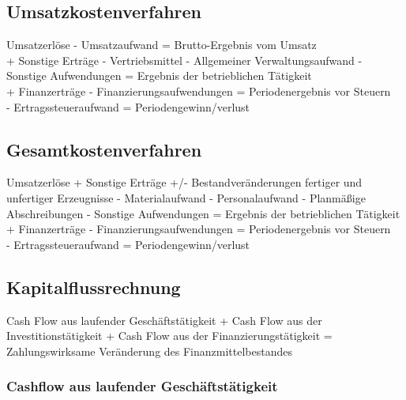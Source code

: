 \documentclass{article}
\begin{document}
\subsection{Umsatzkostenverfahren}

Umsatzerlöse - Umsatzaufwand = Brutto-Ergebnis vom Umsatz \\
+ Sonstige Erträge - Vertriebsmittel - Allgemeiner Verwaltungsaufwand - Sonstige Aufwendungen = Ergebnis der betrieblichen Tätigkeit \\
+ Finanzerträge - Finanzierungsaufwendungen = Periodenergebnis vor Steuern\\
 - Ertragssteueraufwand = Periodengewinn/verlust 

\subsection{Gesamtkostenverfahren}

Umsatzerlöse + Sonstige Erträge +/- Bestandveränderungen fertiger und unfertiger Erzeugnisse - Materialaufwand - Personalaufwand - Planmäßige Abschreibungen - Sonstige Aufwendungen = Ergebnis der betrieblichen Tätigkeit \\
+ Finanzerträge - Finanzierungsaufwendungen = Periodenergebnis vor Steuern\\
 - Ertragssteueraufwand = Periodengewinn/verlust 

\subsection{Kapitalflussrechnung}

Cash Flow aus laufender Geschäftstätigkeit
+ Cash Flow aus der Investitionstätigkeit
+ Cash Flow aus der Finanzierungstätigkeit
= Zahlungswirksame Veränderung des Finanzmittelbestandes

\subsubsection{Cashflow aus laufender Geschäftstätigkeit}
\end{document}
